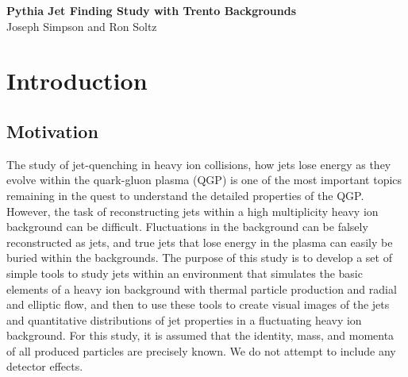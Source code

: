 \documentclass[11pt]{article}
\begin{document}
%
%
\newcommand{\zapspace}{\topsep=1pt\partopsep=1pt\itemsep=1pt\parskip=2pt}
\newcommand{\trento}{\mbox{T$_{\rm R}$ENTo}}

\begin{center}
{\Large \bf Pythia Jet Finding Study with Trento Backgrounds\\}
\bigskip
Joseph Simpson and Ron Soltz
\end{center}

\begin{abstract}
We present results applying the Pythia SlowJet Finder to Pythia generated QCD and QED hard processes in the presence of simulated heavy ion backgrounds.  The hard process events are generated with Pythia version~8.219 for $\sqrt{s}$200~GeV proton-proton collisions and the backgrounds are generated by the Reduced Thickness Event-by-event Nuclear Topology model \trento\ for Au-Au collisions with a nucleon-nucleon cross-section of 4.23~fm$^2$.  The \trento\ model is used to determine the initial entropy and ellipticity from which the the total charged particle multiplicity and elliptic flow are determined.  We report results in the form of event displays, total $p_T$ distributions, and fragmentation distributions for SlowJet applied to Pythia events with and without the simulated heavy ion backgrounds.
\end{abstract}

\tableofcontents

\newpage 

\section{Introduction}
\subsection*{Motivation}

The study of jet-quenching in heavy ion collisions, how jets lose energy as they evolve within the quark-gluon plasma (QGP) is one of the most important topics remaining in the quest to understand the detailed properties of the QGP.  However, the task of reconstructing jets within a high multiplicity heavy ion background can be difficult.  Fluctuations in the background can be falsely reconstructed as jets, and true jets that lose energy in the plasma can easily be buried within the backgrounds.  The purpose of this study is to develop a set of simple tools to study jets within an environment that simulates the basic elements of a heavy ion background with thermal particle production and radial and elliptic flow, and then to use these tools to create visual images of the jets and quantitative distributions of jet properties in a fluctuating heavy ion background.  For this study, it is assumed that the identity, mass, and momenta of all produced particles are precisely known.  We do not attempt to include any detector effects.
\end{document}
